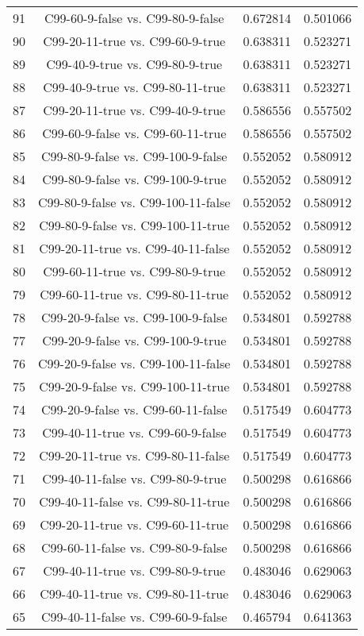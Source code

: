 \documentclass[a4paper,10pt]{article}
\begin{document}
\begin{landscape}
\begin{table}[!htp]
\begin{tabular}{cccc}
91&C99-60-9-false vs. C99-80-9-false&0.672814&0.501066\\
90&C99-20-11-true vs. C99-60-9-true&0.638311&0.523271\\
89&C99-40-9-true vs. C99-80-9-true&0.638311&0.523271\\
88&C99-40-9-true vs. C99-80-11-true&0.638311&0.523271\\
87&C99-20-11-true vs. C99-40-9-true&0.586556&0.557502\\
86&C99-60-9-false vs. C99-60-11-true&0.586556&0.557502\\
85&C99-80-9-false vs. C99-100-9-false&0.552052&0.580912\\
84&C99-80-9-false vs. C99-100-9-true&0.552052&0.580912\\
83&C99-80-9-false vs. C99-100-11-false&0.552052&0.580912\\
82&C99-80-9-false vs. C99-100-11-true&0.552052&0.580912\\
81&C99-20-11-true vs. C99-40-11-false&0.552052&0.580912\\
80&C99-60-11-true vs. C99-80-9-true&0.552052&0.580912\\
79&C99-60-11-true vs. C99-80-11-true&0.552052&0.580912\\
78&C99-20-9-false vs. C99-100-9-false&0.534801&0.592788\\
77&C99-20-9-false vs. C99-100-9-true&0.534801&0.592788\\
76&C99-20-9-false vs. C99-100-11-false&0.534801&0.592788\\
75&C99-20-9-false vs. C99-100-11-true&0.534801&0.592788\\
74&C99-20-9-false vs. C99-60-11-false&0.517549&0.604773\\
73&C99-40-11-true vs. C99-60-9-false&0.517549&0.604773\\
72&C99-20-11-true vs. C99-80-11-false&0.517549&0.604773\\
71&C99-40-11-false vs. C99-80-9-true&0.500298&0.616866\\
70&C99-40-11-false vs. C99-80-11-true&0.500298&0.616866\\
69&C99-20-11-true vs. C99-60-11-true&0.500298&0.616866\\
68&C99-60-11-false vs. C99-80-9-false&0.500298&0.616866\\
67&C99-40-11-true vs. C99-80-9-true&0.483046&0.629063\\
66&C99-40-11-true vs. C99-80-11-true&0.483046&0.629063\\
65&C99-40-11-false vs. C99-60-9-false&0.465794&0.641363\\

\end{tabular}
\end{table}
\end{landscape}
\end{document}
